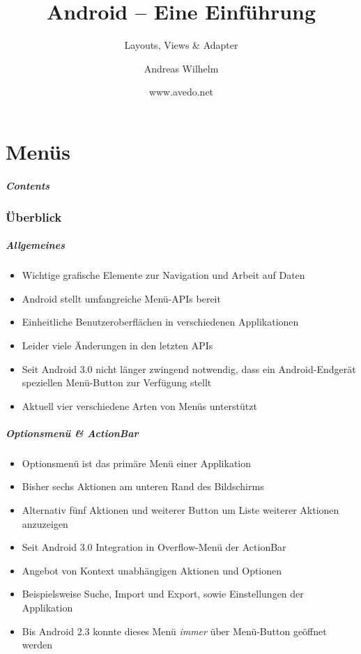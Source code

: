 \title{Android -- Eine Einführung}
\subtitle{Layouts, Views \& Adapter}
\author[A. Wilhelm]{Andreas Wilhelm}
\titlegraphic{}
\date{www.avedo.net}

\begin{frame}[plain]
  \titlepage
\end{frame}

\part{Menüs}
\frame{\partpage}
\begin{frame}
	\frametitle{Contents}
	\tableofcontents[]
\end{frame}

\section{Überblick}
\begin{frame}
   \frametitle{Allgemeines}
   \begin{itemize}
      \item Wichtige grafische Elemente zur Navigation und Arbeit auf Daten
      \item Android stellt umfangreiche Menü-APIs bereit
      \item Einheitliche Benutzeroberflächen in verschiedenen Applikationen
      \item Leider viele Änderungen in den letzten APIs
      \item Seit Android 3.0 nicht länger zwingend notwendig, dass ein Android-Endgerät 
         speziellen Menü-Button zur Verfügung stellt
      \item Aktuell vier verschiedene Arten von Menüs unterstützt
   \end{itemize}
\end{frame}

\begin{frame}
   \frametitle{Optionsmenü \& ActionBar}
   \begin{itemize}
      \item Optionsmenü ist das primäre Menü einer Applikation
      \item Bisher sechs Aktionen am unteren Rand des Bildschirms
      \item Alternativ fünf Aktionen und weiterer Button um Liste weiterer Aktionen anzuzeigen
      \item Seit Android 3.0 Integration in Overflow-Menü der ActionBar
      \item Angebot von Kontext unabhängigen Aktionen und Optionen
      \item Beispielsweise Suche, Import und Export, sowie Einstellungen der Applikation
      \item Bis Android 2.3 konnte dieses Menü \emph{immer} über Menü-Button geöffnet werden
   \end{itemize}
\end{frame}

